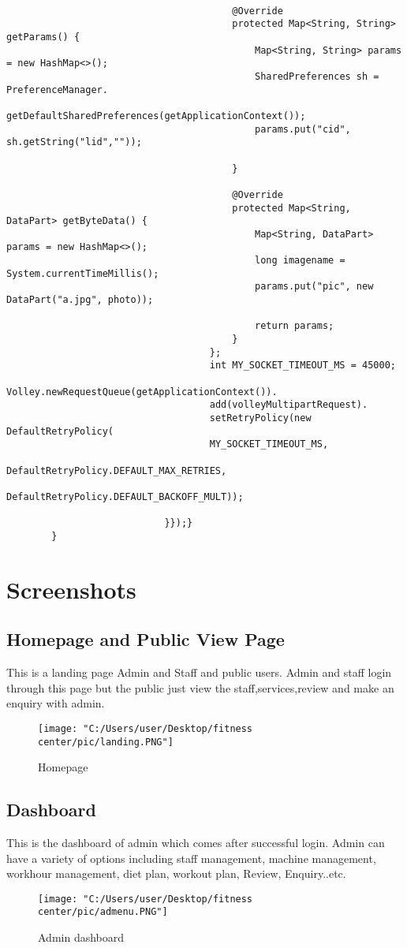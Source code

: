 \documentclass[a4paper,12pt,toc=flat]{report}
\begin{document}
{{{{\begin{itemize}
\begin{verbatim}
 										
 										@Override
 										protected Map<String, String> getParams() {
 											Map<String, String> params = new HashMap<>();
 											SharedPreferences sh = PreferenceManager.
 											getDefaultSharedPreferences(getApplicationContext());
 											params.put("cid", sh.getString("lid",""));
 										
 										}
 										
 										@Override
 										protected Map<String, DataPart> getByteData() {
 											Map<String, DataPart> params = new HashMap<>();
 											long imagename = System.currentTimeMillis();
 											params.put("pic", new DataPart("a.jpg", photo));
 											
 											return params;
 										}
 									};
 									int MY_SOCKET_TIMEOUT_MS = 45000;
 									Volley.newRequestQueue(getApplicationContext()).
 									add(volleyMultipartRequest).
 									setRetryPolicy(new DefaultRetryPolicy(
 									MY_SOCKET_TIMEOUT_MS,
 									DefaultRetryPolicy.DEFAULT_MAX_RETRIES,
 									DefaultRetryPolicy.DEFAULT_BACKOFF_MULT));
 								
 							}});}
 		}
 			\end{verbatim}
 		\end{itemize}
 }}
 
 
 \pagebreak
 \section{Screenshots}
  \subsection {Homepage and Public View Page}
  This is a landing page Admin and Staff and public users. Admin and staff login through this page but the public just view the staff,services,review and make an enquiry with admin.
   \begin{figure}[bph]
  	\centering
  	\texttt{[image: "C:/Users/user/Desktop/fitness center/pic/landing.PNG"]} 
  	\caption{Homepage} 
  	\label{u1}
  \end{figure}
 \pagebreak
 
 \subsection {Dashboard}
 This is the dashboard of admin which comes after successful login. Admin can have a variety of options including staff management, machine management, workhour management, diet plan, workout plan, Review, Enquiry..etc.
 \begin{figure}[bph]
 	\centering
 	\texttt{[image: "C:/Users/user/Desktop/fitness center/pic/admenu.PNG"]} 
 	\caption{Admin dashboard} 
 	\label{u1}
 \end{figure}
 \pagebreak
}}
\end{document}
